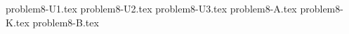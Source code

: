 \documentclass{article}
\begin{document}
{problem8-U1.tex}
{problem8-U2.tex}
{problem8-U3.tex}
{problem8-A.tex}
{problem8-K.tex}
{problem8-B.tex}
\end{document}
